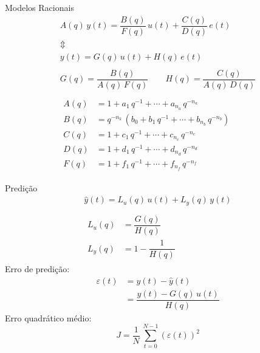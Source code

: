 \documentclass{beamer}
\newcommand{\Prod}{\,}
\renewcommand{\Prod}{\,}
\begin{document}
\begin{frame}{Modelos Racionais}
  \begin{gather}
    A(q) \Prod y(t) = \dfrac{B(q)}{F(q)} \Prod u(t) + \dfrac{C(q)}{D(q)} \Prod e(t)
    \\\Updownarrow\\
    y(t) = G(q) \Prod u(t) + H(q) \Prod e(t)
    \\\\
    G(q) = \dfrac{B(q)}{A(q) \Prod F(q)}
    \qquad
    H(q) = \dfrac{C(q)}{A(q) \Prod D(q)}
    \\\\
    \begin{aligned}
      A(q) &= 1 + a_1 \Prod q^{-1} + \dotsb + a_{n_a} \Prod q^{-n_a}
      \\
      B(q) &= q^{-n_k} \Prod \left(b_0 + b_1 \Prod q^{-1} + \dotsb + b_{n_b} \Prod q^{-n_b}\right)
      \\
      C(q) &= 1 + c_1 \Prod q^{-1} + \dotsb + c_{n_c} \Prod q^{-n_c}
      \\
      D(q) &= 1 + d_1 \Prod q^{-1} + \dotsb + d_{n_d} \Prod q^{-n_d}
      \\
      F(q) &= 1 + f_1 \Prod q^{-1} + \dotsb + f_{n_f} \Prod q^{-n_f}
    \end{aligned}
  \end{gather}
\end{frame}

\begin{frame}{Predição}
  \begin{gather}
    \hat{y}(t) = L_u(q) \Prod u(t) + L_y(q) \Prod y(t)
    \\\\
    \begin{aligned}
      L_u(q) &= \dfrac{G(q)}{H(q)}
      \\
      L_y(q) &= 1 - \dfrac{1}{H(q)}
    \end{aligned}
  \end{gather}
  Erro de predição:
  \begin{align}
    \varepsilon(t)
    &= y(t) - \hat{y}(t)
    \\
    &= \dfrac{y(t) - G(q) \Prod u(t)}{H(q)}
  \end{align}
  Erro quadrático médio:
  \begin{equation}
    J = \dfrac{1}{N} \Prod \sum_{t=0}^{N-1}{\left(\varepsilon(t)\right)^2}
  \end{equation}
\end{frame}
\end{document}
